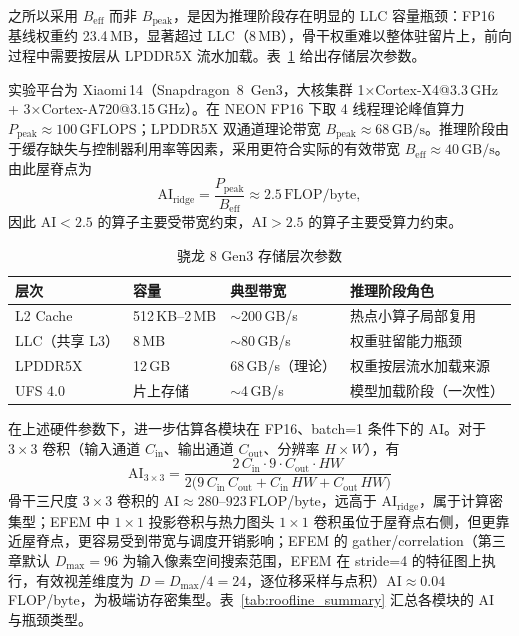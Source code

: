 之所以采用 $B_{\text{eff}}$ 而非 $B_{\text{peak}}$，是因为推理阶段存在明显的 LLC 容量瓶颈：FP16 基线权重约 23.4\,MB，显著超过 LLC（8\,MB），骨干权重难以整体驻留片上，前向过程中需要按层从 LPDDR5X 流水加载。表~\ref{tab:memory_hierarchy} 给出存储层次参数。

实验平台为 Xiaomi\,14（Snapdragon~8~Gen3，大核集群 1×Cortex-X4@3.3\,GHz + 3×Cortex-A720@3.15\,GHz）。在 NEON FP16 下取 4 线程理论峰值算力
$P_{\text{peak}}\approx100\,\text{GFLOPS}$；LPDDR5X 双通道理论带宽
$B_{\text{peak}}\approx68\,\text{GB/s}$。推理阶段由于缓存缺失与控制器利用率等因素，采用更符合实际的有效带宽
$B_{\text{eff}}\approx40\,\text{GB/s}$。由此屋脊点为
\[
  \mathrm{AI}_{\text{ridge}}=\frac{P_{\text{peak}}}{B_{\text{eff}}}\approx2.5\,\text{FLOP/byte},
\]
因此 $\mathrm{AI}<2.5$ 的算子主要受带宽约束，$\mathrm{AI}>2.5$ 的算子主要受算力约束。

\begin{table}[htbp]
  \centering
  \small
\caption{骁龙 8 Gen3 存储层次参数}
  \label{tab:memory_hierarchy}
  \begin{tabular}{llll}
    \toprule
    层次 & 容量 & 典型带宽  & 推理阶段角色 \\
    \midrule
    L2 Cache     & 512\,KB–2\,MB & $\sim$200\,GB/s & 热点小算子局部复用 \\
    LLC（共享 L3） & 8\,MB         & $\sim$80\,GB/s  & 权重驻留能力瓶颈 \\
    LPDDR5X      & 12\,GB        & 68\,GB/s（理论） & 权重按层流水加载来源 \\
    UFS 4.0      & 片上存储       & $\sim$4\,GB/s   & 模型加载阶段（一次性） \\
    \bottomrule
  \end{tabular}
\end{table}

在上述硬件参数下，进一步估算各模块在 FP16、batch=1 条件下的 AI。对于 $3\times3$ 卷积（输入通道 $C_{\text{in}}$、输出通道 $C_{\text{out}}$、分辨率 $H\!\times\! W$），有
\[
  \mathrm{AI}_{3\times3}
  = \frac{2\,C_{\text{in}}\cdot 9\cdot C_{\text{out}}\cdot HW}
         {2\bigl(9\,C_{\text{in}}\,C_{\text{out}}
                 + C_{\text{in}}\,HW
                 + C_{\text{out}}\,HW\bigr)}
\]
骨干三尺度 $3\!\times\!3$ 卷积的 $\mathrm{AI}\approx280$--$923$\,FLOP/byte，远高于 $\mathrm{AI}_{\text{ridge}}$，属于计算密集型；EFEM 中 $1\!\times\!1$ 投影卷积与热力图头 $1\!\times\!1$ 卷积虽位于屋脊点右侧，但更靠近屋脊点，更容易受到带宽与调度开销影响；EFEM 的 gather/correlation（第三章默认 $D_{\max}=96$ 为输入像素空间搜索范围，EFEM 在 stride=4 的特征图上执行，有效视差维度为 $D=D_{\max}/4=24$，逐位移采样与点积）$\mathrm{AI}\approx0.04$\,FLOP/byte，为极端访存密集型。表~\ref{tab:roofline_summary} 汇总各模块的 AI 与瓶颈类型。

